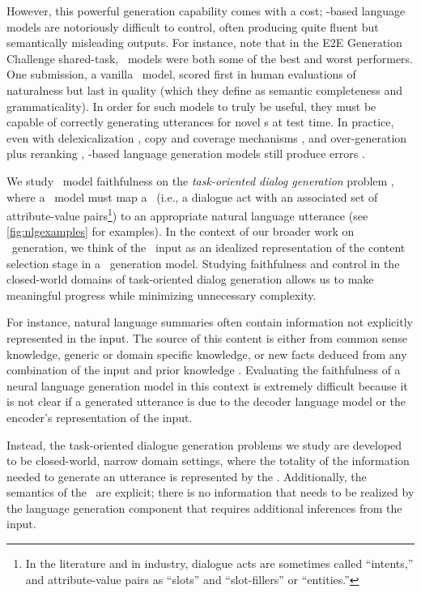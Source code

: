 However, this powerful generation capability comes with a cost;
\deeplearning-based language models are notoriously difficult to control,
often producing quite fluent but  semantically misleading outputs. For
instance, \citet{dusek2020} note that in the E2E Generation Challenge
shared-task, \sequencetosequence~models were both some of the best and 
worst performers. One submission, a vanilla \sequencetosequence~model, scored first in human
evaluations of naturalness but last in quality (which they define as semantic
completeness and grammaticality).  In order for such models to truly be
useful, they must be capable of correctly generating utterances for novel
\meaningrepresentation s at test time.  In practice, even with
delexicalization \citep{dusek2016,juraska2018}, copy and coverage mechanisms
\citep{elder2018}, and over-generation plus reranking
\citep{dusek2016,juraska2018}, \deeplearning-based language generation models
still produce errors \citep{dusek2020}.


We study \sequencetosequence~model faithfulness on the \textit{task-oriented dialog generation} problem
\citep{mairesse2010,wen2015,dusek2018}, where a
\naturallanguagegeneration~model must map a \meaningrepresentation~(i.e., a
dialogue act with an associated set of attribute-value pairs\footnote{In the
literature and in industry, dialogue acts are sometimes called ``intents,''
and attribute-value pairs as ``slots'' and ``slot-fillers'' or ``entities.''})
to an appropriate natural language utterance (see \autoref{fig:nlgexamples}
for examples).  In the context of our broader work on \texttotext~generation,
we think of the \meaningrepresentation~input as an idealized representation of
the content selection stage in a \texttotext~generation model.  Studying
faithfulness and control in the closed-world domains of task-oriented dialog
generation allows us to make meaningful progress while minimizing unnecessary
complexity.

For instance, natural language summaries often contain information not
explicitly represented in the input. The source of this content is either from
common sense knowledge, generic or domain specific knowledge, or new facts
deduced from any combination of the input and prior knowledge
\citep{wiseman2017,wang2019}.  Evaluating the faithfulness of a neural language
generation model in this context is extremely difficult because it is not
clear if a generated utterance is due to the decoder language model or 
the encoder's representation of the input.

Instead, the task-oriented dialogue generation problems we study are developed
to be closed-world, narrow domain settings, where the totality of the
information needed to generate an utterance is represented by the
\meaningrepresentation. Additionally, the
semantics of the \meaningrepresentation~are explicit; there is no
information that needs to be realized by the language generation component
that requires additional inferences from the input.

